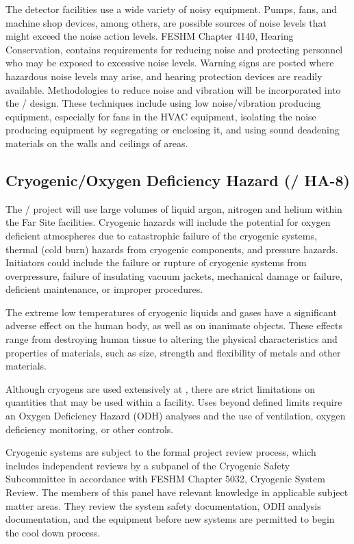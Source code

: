 The detector facilities use a wide variety of noisy equipment. Pumps,
fans, and machine shop devices, among others, are possible sources of
noise levels that might exceed the \fnal noise action levels. FESHM
Chapter 4140, Hearing Conservation, contains requirements for reducing
noise and protecting personnel who may be exposed to excessive noise
levels. Warning signs are posted where hazardous noise levels may
arise, and hearing protection devices are readily
available. Methodologies to reduce noise and vibration will be
incorporated into the / design. These techniques include using
low noise/vibration producing equipment, especially for fans in the
HVAC equipment, isolating the noise producing equipment by segregating
or enclosing it, and using sound deadening materials on the walls and
ceilings of areas.

\subsection{Cryogenic/Oxygen Deficiency Hazard (/ HA-8)}

The / project will use large volumes of liquid argon, nitrogen
and helium within the Far Site facilities. Cryogenic hazards will
include the potential for oxygen deficient atmospheres due to
catastrophic failure of the cryogenic systems, thermal (cold burn)
hazards from cryogenic components, and pressure hazards. Initiators
could include the failure or rupture of cryogenic systems from
overpressure, failure of insulating vacuum jackets, mechanical damage
or failure, deficient maintenance, or improper procedures.

The extreme low temperatures of cryogenic liquids and gases have a
significant adverse effect on the human body, as well as on inanimate
objects. These effects range from destroying human tissue to altering
the physical characteristics and properties of materials, such as
size, strength and flexibility of metals and other materials.

Although cryogens are used extensively at \fnal, there are strict
limitations on quantities that may be used within a facility. Uses
beyond defined limits require an Oxygen Deficiency Hazard (ODH)
analyses and the use of ventilation, oxygen deficiency monitoring, or
other controls.

Cryogenic systems are subject to the formal project review process,
which includes independent reviews by a subpanel of the Cryogenic
Safety Subcommittee in accordance with FESHM Chapter 5032, Cryogenic
System Review. The members of this panel have relevant knowledge in
applicable subject matter areas. They review the system safety
documentation, ODH analysis documentation, and the equipment before
new systems are permitted to begin the cool down process.

